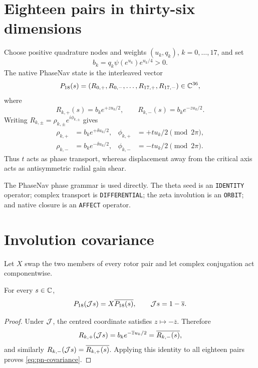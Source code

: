 \section{Eighteen pairs in thirty-six dimensions}

Choose positive quadrature nodes and weights $(u_k,q_k)$, $k=0,\ldots,17$, and
set
\begin{equation}
 b_k=q_k\psi(e^{u_k})e^{u_k/4}>0.
 \label{eq:base-gain-native}
\end{equation}
The native PhaseNav state is the interleaved vector
\begin{equation}
 P_{18}(s)=
 \left(R_{0,+},R_{0,-},\ldots,R_{17,+},R_{17,-}\right)\in\mathbb{C}^{36},
 \label{eq:pn-state}
\end{equation}
where
\begin{equation}
 R_{k,+}(s)=b_ke^{+zu_k/2},\qquad
 R_{k,-}(s)=b_ke^{-zu_k/2}.
 \label{eq:pn-rotor-pair}
\end{equation}
Writing $R_{k,\pm}=\rho_{k,\pm}e^{i\phi_{k,\pm}}$ gives
\begin{align}
 \rho_{k,+}&=b_ke^{+\delta u_k/2}, &
 \phi_{k,+}&=+tu_k/2\pmod{2\pi},\label{eq:pn-plus}\\
 \rho_{k,-}&=b_ke^{-\delta u_k/2}, &
 \phi_{k,-}&=-tu_k/2\pmod{2\pi}.\label{eq:pn-minus}
\end{align}
Thus $t$ acts as phase transport, whereas displacement away from the critical
axis acts as antisymmetric radial gain shear.

The PhaseNav phase grammar is used directly.  The theta seed is an
\texttt{IDENTITY} operator; complex transport is \texttt{DIFFERENTIAL}; the
zeta involution is an \texttt{ORBIT}; and native closure is an
\texttt{AFFECT} operator.

\section{Involution covariance}

Let $X$ swap the two members of every rotor pair and let complex conjugation act
componentwise.

\begin{theorem}
\label{thm:pn-covariance}
For every $s\in\mathbb{C}$,
\begin{equation}
 P_{18}(\mathcal{J} s)=X\overline{P_{18}(s)},
 \qquad \mathcal{J} s=1-\overline{s}.
 \label{eq:pn-covariance}
\end{equation}
\end{theorem}

\begin{proof}
Under $\mathcal{J}$, the centred coordinate satisfies $z\mapsto-\overline z$.  Therefore
\[
 R_{k,+}(\mathcal{J} s)=b_ke^{-\overline z u_k/2}
 =\overline{R_{k,-}(s)},
\]
and similarly $R_{k,-}(\mathcal{J} s)=\overline{R_{k,+}(s)}$.  Applying this identity to
all eighteen pairs proves \cref{eq:pn-covariance}.
\end{proof}

